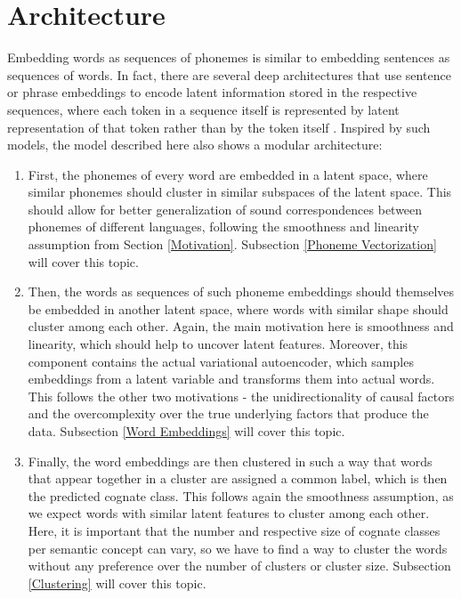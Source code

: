 \documentclass[6pt]{article}
\begin{document}
\section{Architecture}
\label{Architecture}
Embedding words as sequences of phonemes is similar to embedding sentences as sequences of words. In fact, there are several deep architectures that use sentence or phrase embeddings to encode latent information stored in the respective sequences, where each token in a sequence itself is represented by latent representation of that token rather than by the token itself \citep{kiros2015skip,zhang2014bilingually}.
Inspired by such models, the model described here also shows a modular architecture:
\begin{enumerate}
\item First, the phonemes of every word are embedded in a latent space, where similar phonemes should cluster in similar subspaces of the latent space. This should allow for better generalization of sound correspondences between phonemes of different languages, following the smoothness and linearity assumption from Section \ref{Motivation}. Subsection \ref{Phoneme Vectorization} will cover this topic.
\item Then, the words as sequences of such phoneme embeddings should themselves be embedded in another latent space, where words with similar shape should cluster among each other.  Again, the main motivation here is smoothness and linearity, which should help to uncover latent features. Moreover, this component contains the actual variational autoencoder, which samples embeddings from a latent variable and transforms them into actual words. This follows the other two motivations - the unidirectionality of causal factors and the overcomplexity over the true underlying factors that produce the data. Subsection \ref{Word Embeddings} will cover this topic.
\item Finally, the word embeddings are then clustered in such a way that words that appear together in a cluster are assigned a common label, which is then the predicted cognate class.  This follows again the smoothness assumption, as we expect words with similar latent features to cluster among each other. Here, it is important that the number and respective size of cognate classes per semantic concept can vary, so we have to find a way to cluster the words without any preference over the number of clusters or cluster size. Subsection \ref{Clustering} will cover this topic.
\end{enumerate}
\end{document}
